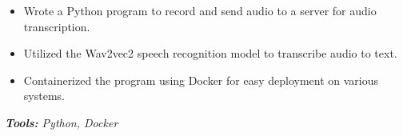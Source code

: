 \documentclass[10pt,letter]{altacv}
\begin{document}
\divider

\begin{itemize}
  \item Wrote a Python program to record and send audio to a server for audio transcription.
  \item Utilized the Wav2vec2 speech recognition model to transcribe audio to text.
  \item Containerized the program using Docker for easy deployment on various systems.
\end{itemize}
\textit{\textbf{Tools:} Python, Docker}




\medskip


\end{document}
